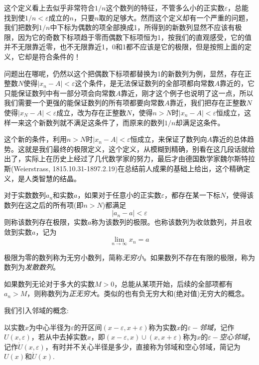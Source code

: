 这个定义看上去似乎非常符合$1/n$这个数列的特征，不管多么小的正实数$\varepsilon$，总能找到使$1/n < \varepsilon$成立的$n$，只要$n$取的足够大。然而这个定义却有一个严重的问题，我们把数列$1/n$中下标为偶数的项全部换成1，所得到的新数列显然不应该有极限，因为它的奇数下标项趋于零而偶数下标项恒为1，按我们的直观感受，它的值并不无限靠近零，也不无限靠近1，0和1都不应该是它的极限，但是按照上面的定义，它却是符合条件的！

问题出在哪呢，仍然以这个把偶数下标项都替换为1的新数列为例，显然，存在正整数$N$使得$|x_n-A|<\varepsilon$这个条件，是无法保证数列的全部项都向常数$A$靠近的，它只能保证数列中有一部分项会向常数$A$靠近，刚才这个例子也说明了这一点，所以我们需要一个更强的能保证数列的所有项都要向常数$A$靠近，我们把存在正整数$N$使得$|x_N-A|<\varepsilon$成立，改为存在正整数$N$，使得$n>N$时$|x_n-A|<\varepsilon$恒成立，这样一来这个新数列就不满足这条件了，而原来的数列$1/n$却满足这条件。

这个新的条件，利用$n>N$时$|x_n-A|<\varepsilon$恒成立，来保证了数列向$A$靠近的总体趋势。这就是我们最终的极限定义，这个定义，从模糊到精确，别看在这几段话就给出了，实际上在历史上经过了几代数学家的努力，最后才由德国数学家魏尔斯特拉斯(Weierstrass, 1815.10.31-1897.2.19)在总结前人成果的基础上给出，这个精确定义，是人类智慧的结晶。

\begin{definition}[数列极限]
  对于实数数列${a_n}$和实数$a$，如果对于任意小的正实数$\varepsilon$，都存在某一下标$N$，使得该数列在这之后的所有项(即$n>N$)都满足
  \begin{equation}
    \label{eq:the-definition-of-sequence-limit}
    |a_n-a|<\varepsilon
  \end{equation}
  则称该数列存在极限，实数$a$称为该数列的极限。也称该数列为收敛数列，并且收敛到实数$a$，记为
  \begin{equation}
    \label{eq:limit-definition-for-number-sequence}
    \lim_{n \to \infty}x_n = a
  \end{equation}
\end{definition}

极限为零的数列称为无穷小数列，简称\emph{无穷小}。如果数列不存在有限的极限，称为数列为\emph{发散数列}。

如果数列无论对于多大的实数$M>0$，总能从某项开始，后续的全部项都有$a_n>M$，则称数列为\emph{正无穷大}。类似的也有负无穷大和(绝对值)无穷大的概念。

我们引入邻域的概念:
\begin{definition}[邻域]
以实数$x$为中心半径为$\varepsilon$的开区间$(x-\varepsilon,x+\varepsilon)$称为实数$x$的$\varepsilon-$\emph{邻域}，记作$U(x,\varepsilon)$，若从中去掉实数$x$，即$(x-\varepsilon,x)\cup(x,x+\varepsilon)$称为$x$的$\varepsilon-$\emph{空心邻域}，记作$\mathring{U}(x,\varepsilon)$，有时并不关心半径是多少，直接称为邻域和空心邻域，简记为$U(x)$和$\mathring{U}(x)$.
\end{definition}

